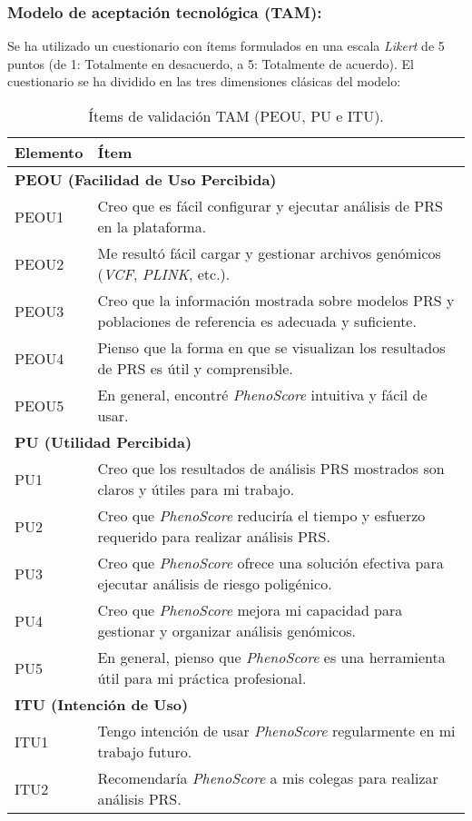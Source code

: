 \subsubsection{Modelo de aceptación tecnológica (TAM):}
Se ha utilizado un cuestionario con ítems formulados en una escala \textit{Likert} de 5 puntos (de 1: Totalmente en desacuerdo, a 5: Totalmente de acuerdo). El cuestionario se ha dividido en las tres dimensiones clásicas del modelo:

\renewcommand{\arraystretch}{1.3} %
\begin{table}[H]
    \centering
    \small
    \begin{tabularx}{1\textwidth}{lX} 
        \toprule
        \textbf{Elemento} & \textbf{Ítem} \\
        \toprule
        \multicolumn{2}{l}{\textbf{PEOU (Facilidad de Uso Percibida)}} \\ \midrule
        PEOU1 & Creo que es fácil configurar y ejecutar análisis de PRS en la plataforma. \\
        PEOU2 & Me resultó fácil cargar y gestionar archivos genómicos (\textit{VCF}, \textit{PLINK}, etc.). \\
        PEOU3 & Creo que la información mostrada sobre modelos PRS y poblaciones de referencia es adecuada y suficiente. \\
        PEOU4 & Pienso que la forma en que se visualizan los resultados de PRS es útil y comprensible. \\
        PEOU5 & En general, encontré \textit{PhenoScore} intuitiva y fácil de usar. \\
        \bottomrule
        \multicolumn{2}{l}{\textbf{PU (Utilidad Percibida)}} \\ \midrule
        PU1 & Creo que los resultados de análisis PRS mostrados son claros y útiles para mi trabajo. \\
        PU2 & Creo que \textit{PhenoScore} reduciría el tiempo y esfuerzo requerido para realizar análisis PRS. \\
        PU3 & Creo que \textit{PhenoScore} ofrece una solución efectiva para ejecutar análisis de riesgo poligénico. \\
        PU4 & Creo que \textit{PhenoScore} mejora mi capacidad para gestionar y organizar análisis genómicos. \\
        PU5 & En general, pienso que \textit{PhenoScore} es una herramienta útil para mi práctica profesional. \\
        \bottomrule
        \multicolumn{2}{l}{\textbf{ITU (Intención de Uso)}} \\ \midrule
        ITU1 & Tengo intención de usar \textit{PhenoScore} regularmente en mi trabajo futuro. \\
        ITU2 & Recomendaría \textit{PhenoScore} a mis colegas para realizar análisis PRS. \\
        \bottomrule
    \end{tabularx}
    \caption{Ítems de validación TAM (PEOU, PU e ITU).}
    \label{tab:tam-items}
\end{table}
\renewcommand{\arraystretch}{1.0} %



